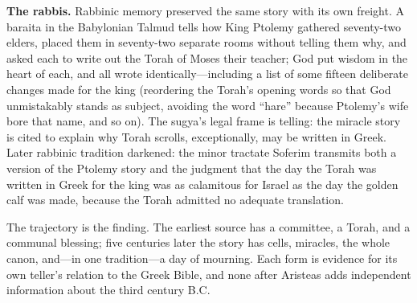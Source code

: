 \textbf{The rabbis.} Rabbinic memory preserved the same story with its own
freight. A baraita in the Babylonian Talmud tells how King Ptolemy
gathered seventy-two elders, placed them in seventy-two separate rooms
without telling them why, and asked each to write out the Torah of Moses
their teacher; God put wisdom in the heart of each, and all wrote
identically---including a list of some fifteen deliberate changes made for
the king (reordering the Torah's opening words so that God unmistakably
stands as subject, avoiding the word ``hare'' because Ptolemy's wife bore
that name, and so on). The sugya's legal frame is telling: the miracle story is cited to
explain why Torah scrolls, exceptionally, may be written in
Greek. Later rabbinic
tradition darkened: the minor tractate Soferim transmits both a version of
the Ptolemy story and the judgment that the day the Torah was written in
Greek for the king was as calamitous for Israel as the day the golden calf
was made, because the Torah admitted no adequate
translation.

The trajectory is the finding. The earliest source has a committee, a
Torah, and a communal blessing; five centuries later the story has cells,
miracles, the whole canon, and---in one tradition---a day of mourning. Each
form is evidence for its own teller's relation to the Greek Bible, and none
after Aristeas adds independent information about the third century B.C.
